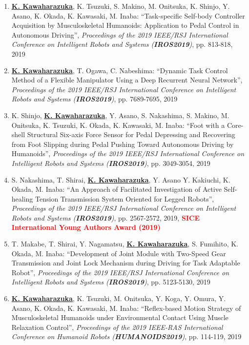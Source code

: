 \documentclass[letterpaper]{article}
\begin{document}
\begin{enumerate}
\item \underline{\textbf{K. Kawaharazuka}}, K. Tsuzuki, S. Makino, M. Onitsuka, K. Shinjo, Y. Asano, K. Okada, K. Kawasaki, M. Inaba: ``Task-specific Self-body Controller Acquisition by Musculoskeletal Humanoids: Application to Pedal Control in Autonomous Driving'', \textit{Proceedings of the 2019 IEEE/RSJ International Conference on Intelligent Robots and Systems (\textit{\textbf{IROS2019}})}, pp. 813-818, 2019
\item \underline{\textbf{K. Kawaharazuka}}, T. Ogawa, C. Nabeshima: ``Dynamic Task Control Method of a Flexible Manipulator Using a Deep Recurrent Neural Network'', \textit{Proceedings of the 2019 IEEE/RSJ International Conference on Intelligent Robots and Systems (\textit{\textbf{IROS2019}})}, pp. 7689-7695, 2019
\item K. Shinjo, \underline{\textbf{K. Kawaharazuka}}, Y. Asano, S. Nakashima, S. Makino, M. Onitsuka, K. Tsuzuki, K. Okada, K. Kawasaki, M. Inaba: ``Foot with a Core-shell Structural Six-axis Force Sensor for Pedal Depressing and Recovering from Foot Slipping during Pedal Pushing Toward Autonomous Driving by Humanoids'', \textit{Proceedings of the 2019 IEEE/RSJ International Conference on Intelligent Robots and Systems (\textit{\textbf{IROS2019}})}, pp. 3049-3054, 2019
\item S. Nakashima, T. Shirai, \underline{\textbf{K. Kawaharazuka}}, Y. Asano Y. Kakiuchi, K. Okada, M. Inaba: ``An Approach of Facilitated Investigation of Active Self-healing Tension Transmission System Oriented for Legged Robots'', \textit{Proceedings of the 2019 IEEE/RSJ International Conference on Intelligent Robots and Systems (\textit{\textbf{IROS2019}})}, pp. 2567-2572, 2019, \textbf{\textcolor{red}{SICE International Young Authors Award (2019)}}
\item T. Makabe, T. Shirai, Y. Nagamatsu, \underline{\textbf{K. Kawaharazuka}}, S. Fumihito, K. Okada, M. Inaba: ``Development of Joint Module with Two-Speed Gear Transmission and Joint Lock Mechanism during Driving for Task Adaptable Robot'', \textit{Proceedings of the 2019 IEEE/RSJ International Conference on Intelligent Robots and Systems (\textit{\textbf{IROS2019}})}, pp. 5123-5130, 2019
\item \underline{\textbf{K. Kawaharazuka}}, K. Tsuzuki, M. Onitsuka, Y. Koga, Y. Omura, Y. Asano, K. Okada, K. Kawasaki, M. Inaba: ``Reflex-based Motion Strategy of Musculoskeletal Humanoids under Environmental Contact Using Muscle Relaxation Control'', \textit{Proceedings of the 2019 IEEE-RAS International Conference on Humanoid Robots (\textit{\textbf{HUMANOIDS2019}})}, pp. 114-119, 2019

\end{enumerate}
\end{document}
